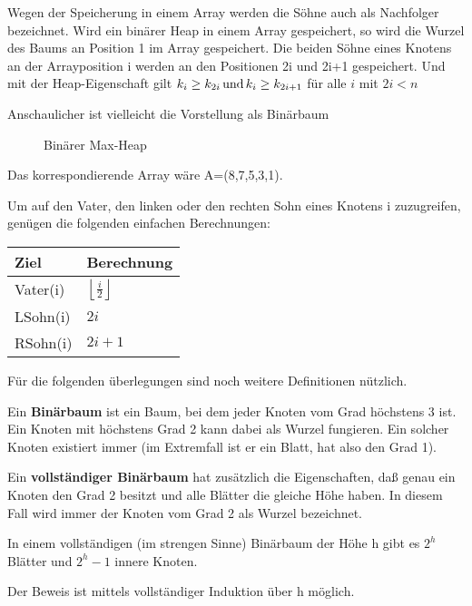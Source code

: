 Wegen der Speicherung in einem Array werden die Söhne auch als Nachfolger bezeichnet.
Wird ein binärer Heap in einem Array gespeichert, so wird die Wurzel des Baums an Position 1 im Array gespeichert. Die beiden
Söhne eines Knotens an der Arrayposition i werden an den Positionen 2i und 2i+1 gespeichert.
Und mit der Heap-Eigenschaft gilt $k_{i}\geq k_{2i}\,\textup{und}\, k_{i}\geq k_{2i+1}$ für alle $i$ mit $2i<n$  

Anschaulicher ist vielleicht die Vorstellung als Binärbaum
\begin{figure}[H]
	\centering
	\caption{Binärer Max-Heap}
	\label{101103a}
\end{figure}
Das korrespondierende Array wäre A=(8,7,5,3,1).
\bigskip

Um auf den Vater, den linken oder den rechten Sohn eines Knotens i zuzugreifen, genügen die folgenden einfachen Berechnungen:

\begin{tabular}{l|l}
Ziel & Berechnung\\
\hline
Vater(i) & $\left\lfloor\frac{i}{2}\right\rfloor$\\
LSohn(i) & $2i$\\
RSohn(i) & $2i+1$\\
\end{tabular}

Für die folgenden überlegungen sind noch weitere Definitionen nützlich.

\begin{definition}
Ein \textbf{Binärbaum} ist ein Baum, bei dem jeder Knoten vom Grad höchstens 3 ist. Ein Knoten mit
höchstens Grad 2 kann dabei als Wurzel fungieren. Ein solcher Knoten existiert immer (im Extremfall ist er ein Blatt, hat also den Grad
1). 
\end{definition}

\begin{definition}
Ein \textbf{vollständiger Binärbaum} hat zusätzlich die Eigenschaften, daß genau ein Knoten den Grad 2 besitzt und alle Blätter die
gleiche Höhe haben. In diesem Fall wird immer der Knoten vom Grad 2 als Wurzel bezeichnet.
\end{definition}

\begin{satz}
In einem vollständigen (im strengen Sinne) Binärbaum der Höhe h gibt es $2^{h}$ Blätter und $2^h-1$ innere Knoten.
\end{satz}
Der Beweis ist mittels vollständiger Induktion über h möglich.

